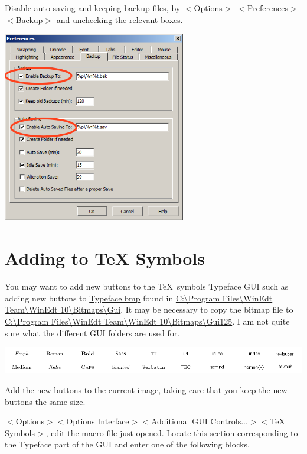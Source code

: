 Disable auto-saving and keeping backup files, by $<$Options$>$ $<$Preferences$>$$<$Backup$>$ and unchecking the relevant boxes.

\centerline{\includegraphics[bb= 0 0 437 457,width=0.6\textwidth]{pic/savingback.png}}




\section{Adding to TeX Symbols }
You may want to add new buttons to the \TeX\ symbols Typeface GUI such as adding new buttons to \url{Typeface.bmp} found in \url{C:\Program Files\WinEdt Team\WinEdt 10\Bitmaps\Gui}.  It may be necessary to copy the bitmap file to \url{C:\Program Files\WinEdt Team\WinEdt 10\Bitmaps\Gui125}. I am not quite sure what the different GUI folders are used for.

\centerline{\includegraphics[bb= 0 0 999 88, width=\textwidth]{pic/Typeface.png}}

Add the new buttons to the current image, taking care that you keep the new buttons the same size.

$<$Options$>$$<$Options Interface$>$$<$Additional GUI Controls...$>$$<$TeX Symbols$>$, edit the macro file just opened. Locate this section corresponding to the Typeface part of the GUI and enter one of the following blocks.


